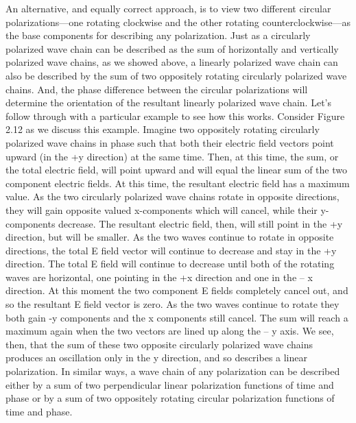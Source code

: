 \documentclass[10pt]{report}
\begin{document}
 An alternative, and equally correct approach, is to view two different circular polarizations—one rotating clockwise and the other rotating counterclockwise—as the base components for describing any polarization.  Just as a circularly polarized wave chain can be described as the sum of horizontally and vertically polarized wave chains, as we showed above, a linearly polarized wave chain can also be described by the sum of two oppositely rotating circularly polarized wave chains.  And, the phase difference between the circular polarizations will determine the orientation of the resultant linearly polarized wave chain.  Let's follow through with a particular example to see how this works.  Consider Figure 2.12 as we discuss this example.  Imagine two oppositely rotating circularly polarized wave chains in phase such that both their electric field vectors point upward (in the +y direction) at the same time.  Then, at this time, the sum, or the total electric field, will point upward and will equal the linear sum of the two component electric fields.  At this time, the resultant electric field has a maximum value.  As the two circularly polarized wave chains rotate in opposite directions, they will gain opposite valued x-components which will cancel, while their y-components decrease.  The resultant electric field, then, will still point in the +y direction, but will be smaller.  As the two waves continue to rotate in opposite directions, the total E field vector will continue to decrease and stay in the +y direction.  The total E field will continue to decrease until both of the rotating waves are horizontal, one pointing in the +x direction and one in the – x direction.  At this moment the two component E fields completely cancel out, and so the resultant E field vector is zero.  As the two waves continue to rotate they both gain -y components and the x components still cancel.  The sum will reach a maximum again when the two vectors are lined up along the – y axis.  We see, then, that the sum of these two opposite circularly polarized wave chains produces an oscillation only in the y direction, and so describes a linear polarization.  In similar ways, a wave chain of any polarization can be described either by a sum of two perpendicular linear polarization functions of time and phase or by a sum of two oppositely rotating circular polarization functions of time and phase.   
 
\end{document}

